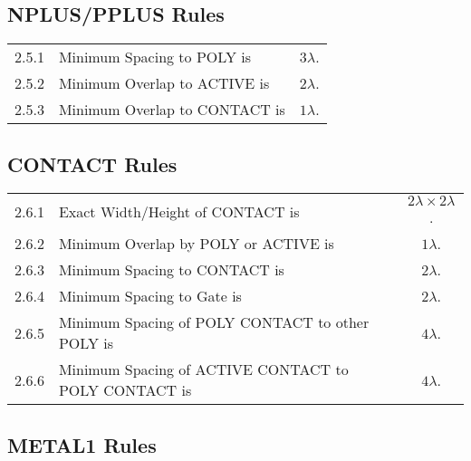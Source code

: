 \subsection{NPLUS/PPLUS Rules}\label{design_rules_plus_rules}

\begin{flushleft}
    \begin{tabular}{c l c}
        2.5.1   & Minimum Spacing to POLY is & $3 \lambda$. \\
        2.5.2   & Minimum Overlap to ACTIVE is & $2 \lambda$. \\
        2.5.3   & Minimum Overlap to CONTACT is & $1 \lambda$. \\
    \end{tabular}
\end{flushleft}

\subsection{CONTACT Rules}\label{design_rules_contact_rules}

\begin{flushleft}
    \begin{tabular}{c l c}
        2.6.1   & Exact Width/Height of CONTACT is & $ 2 \lambda \times 2 \lambda$. \\
        2.6.2   & Minimum Overlap by POLY or ACTIVE is & $1 \lambda$. \\
        2.6.3   & Minimum Spacing to CONTACT is & $2 \lambda$. \\
        2.6.4   & Minimum Spacing to Gate is & $2 \lambda$. \\
        2.6.5   & Minimum Spacing of POLY CONTACT to other POLY is & $4 \lambda$. \\
        2.6.6   & Minimum Spacing of ACTIVE CONTACT to POLY CONTACT is & $4 \lambda$. \\
    \end{tabular}
\end{flushleft}

\subsection{METAL1 Rules}\label{design_rules_metal1_rules}

\begin{center}
\end{center}

